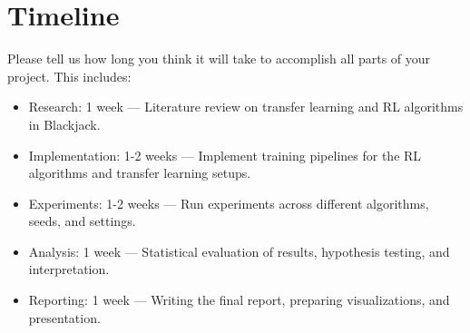 \documentclass{article}
\begin{document}
\section{Timeline}
Please tell us how long you think it will take to accomplish all parts of your project. This includes:
\begin{itemize}
    \item Research: 1 week — Literature review on transfer learning and RL algorithms in Blackjack.
    \item Implementation: 1-2 weeks — Implement training pipelines for the RL algorithms and transfer learning setups.
    \item Experiments: 1-2 weeks — Run experiments across different algorithms, seeds, and settings.
    \item Analysis: 1 week — Statistical evaluation of results, hypothesis testing, and interpretation.
    \item Reporting: 1 week — Writing the final report, preparing visualizations, and presentation.
\end{itemize}
\end{document}
